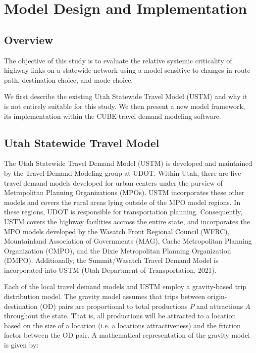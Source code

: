 \chapter{Model Design and Implementation}
\label{chp:chapter3}
\graphicspath{{figures/}{figures/chapter3/}}

\section{Overview} \label{Overview}

The objective of this study is to evaluate the relative systemic
criticality of highway links on a statewide network using a model
sensitive to changes in route path, destination choice, and mode choice.

We first describe the existing Utah Statewide Travel Model (USTM) and why
it is not entirely suitable for this study. We then present a new model
framework, its implementation within the CUBE travel demand
modeling software.

\section{Utah Statewide Travel Model} \label{Utah Statewide Travel Model}

The Utah Statewide Travel Demand Model (USTM) is developed and maintained by
the Travel Demand Modeling group at UDOT. Within Utah, there are five travel
demand models developed for urban centers under the purview of  Metropolitan
Planning Organizations (MPOs). USTM incorporates these other models and covers
the rural areas lying outside of the MPO model regions. In these regions, UDOT
is responsible for transportation planning. Consequently, USTM covers the
highway facilities accross the entire state, and incorporates the MPO models
developed by the Wasatch Front Regional Council (WFRC), Mountainland
Association of Governments (MAG), Cache Metropolitan Planning Organization
(CMPO), and the Dixie Metropolitan Planning Organization (DMPO). Additionally,
the Summit/Wasatch Travel Demand Model is incorporated into USTM (Utah
Department of Transportation, 2021).

Each of the local travel demand models and USTM employ a gravity-based trip
distribution model. The gravity model assumes that trips between origin-
destination (OD) pairs are proportional to total productions $P$ and
attractions $A$ throughout the state. That is, all productions will be
attracted to a location based on the size of a location (i.e. a locations
attractiveness) and the friction factor between the OD
pair. A mathematical representation of the gravity model is given by:

